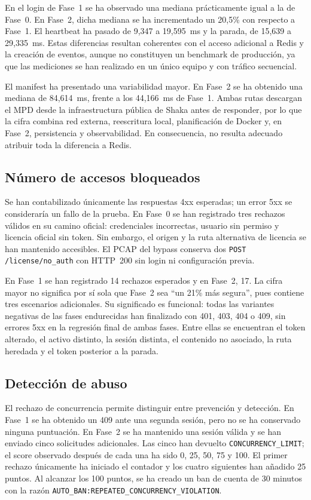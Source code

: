 En el login de Fase~1 se ha observado una mediana prácticamente igual a la de Fase~0. En Fase~2, dicha mediana se ha incrementado un 20,5\% con respecto a Fase~1. El heartbeat ha pasado de 9,347 a 19,595~ms y la parada, de 15,639 a 29,335~ms. Estas diferencias resultan coherentes con el acceso adicional a Redis y la creación de eventos, aunque no constituyen un benchmark de producción, ya que las mediciones se han realizado en un único equipo y con tráfico secuencial.

El manifest ha presentado una variabilidad mayor. En Fase~2 se ha obtenido una mediana de 84,614~ms, frente a los 44,166~ms de Fase~1. Ambas rutas descargan el MPD desde la infraestructura pública de Shaka antes de responder, por lo que la cifra combina red externa, reescritura local, planificación de Docker y, en Fase~2, persistencia y observabilidad. En consecuencia, no resulta adecuado atribuir toda la diferencia a Redis.

\subsection{Número de accesos bloqueados}

Se han contabilizado únicamente las respuestas 4xx esperadas; un error 5xx se consideraría un fallo de la prueba. En Fase~0 se han registrado tres rechazos válidos en su camino oficial: credenciales incorrectas, usuario sin permiso y licencia oficial sin token. Sin embargo, el origen y la ruta alternativa de licencia se han mantenido accesibles. El PCAP del bypass conserva dos \nolinkurl{POST /license/no_auth} con HTTP~200 sin login ni configuración previa.

En Fase~1 se han registrado 14 rechazos esperados y en Fase~2, 17. La cifra mayor no significa por sí sola que Fase~2 sea ``un 21\% más segura'', pues contiene tres escenarios adicionales. Su significado es funcional: todas las variantes negativas de las fases endurecidas han finalizado con 401, 403, 404 o 409, sin errores 5xx en la regresión final de ambas fases. Entre ellas se encuentran el token alterado, el activo distinto, la sesión distinta, el contenido no asociado, la ruta heredada y el token posterior a la parada.

\subsection{Detección de abuso}

El rechazo de concurrencia permite distinguir entre prevención y detección. En Fase~1 se ha obtenido un 409 ante una segunda sesión, pero no se ha conservado ninguna puntuación. En Fase~2 se ha mantenido una sesión válida y se han enviado cinco solicitudes adicionales. Las cinco han devuelto \nolinkurl{CONCURRENCY_LIMIT}; el score observado después de cada una ha sido 0, 25, 50, 75 y 100. El primer rechazo únicamente ha iniciado el contador y los cuatro siguientes han añadido 25 puntos. Al alcanzar los 100 puntos, se ha creado un ban de cuenta de 30 minutos con la razón \nolinkurl{AUTO_BAN:REPEATED_CONCURRENCY_VIOLATION}.

